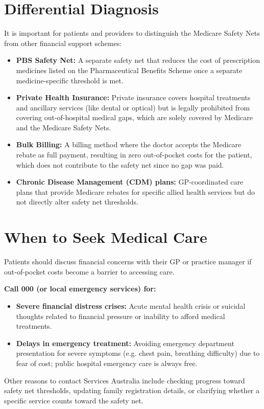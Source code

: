 \section*{Differential Diagnosis}
It is important for patients and providers to distinguish the Medicare Safety Nets from other financial support schemes:
\begin{itemize}
    \item \textbf{PBS Safety Net:} A separate safety net that reduces the cost of prescription medicines listed on the Pharmaceutical Benefits Scheme once a separate medicine-specific threshold is met.
    \item \textbf{Private Health Insurance:} Private insurance covers hospital treatments and ancillary services (like dental or optical) but is legally prohibited from covering out-of-hospital medical gaps, which are solely covered by Medicare and the Medicare Safety Nets.
    \item \textbf{Bulk Billing:} A billing method where the doctor accepts the Medicare rebate as full payment, resulting in zero out-of-pocket costs for the patient, which does not contribute to the safety net since no gap was paid.
    \item \textbf{Chronic Disease Management (CDM) plans:} GP-coordinated care plans that provide Medicare rebates for specific allied health services but do not directly alter safety net thresholds.
\end{itemize}

\section*{When to Seek Medical Care}
Patients should discuss financial concerns with their GP or practice manager if out-of-pocket costs become a barrier to accessing care.

\textbf{Call 000 (or local emergency services) for:}
\begin{itemize}
    \item \textbf{Severe financial distress crises:} Acute mental health crisis or suicidal thoughts related to financial pressure or inability to afford medical treatments.
    \item \textbf{Delays in emergency treatment:} Avoiding emergency department presentation for severe symptoms (e.g. chest pain, breathing difficulty) due to fear of cost; public hospital emergency care is always free.
\end{itemize}
Other reasons to contact Services Australia include checking progress toward safety net thresholds, updating family registration details, or clarifying whether a specific service counts toward the safety net.

